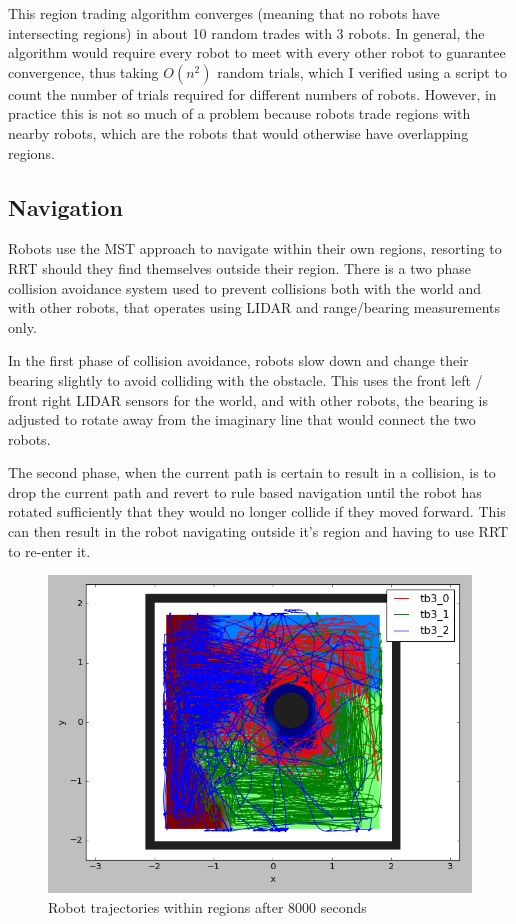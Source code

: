 \documentclass[a4paper, 10pt, conference]{ieeeconf}      %
\begin{document}
This region trading algorithm converges (meaning that no robots have intersecting regions) in about 10 random trades with 3 robots. In general, the algorithm would require every robot to meet with every other robot to guarantee convergence, thus taking $O(n^2)$ random trials, which I verified using a script to count the number of trials required for different numbers of robots. However, in practice this is not so much of a problem because robots trade regions with nearby robots, which are the robots that would otherwise have overlapping regions.

\subsection{Navigation}
Robots use the MST approach to navigate within their own regions, resorting to RRT should they find themselves outside their region. There is a two phase collision avoidance system used to prevent collisions both with the world and with other robots, that operates using LIDAR and range/bearing measurements only.

In the first phase of collision avoidance, robots slow down and change their bearing slightly to avoid colliding with the obstacle. This uses the front left / front right LIDAR sensors for the world, and with other robots, the bearing is adjusted to rotate away from the imaginary line that would connect the two robots.

The second phase, when the current path is certain to result in a collision, is to drop the current path and revert to rule based navigation until the robot has rotated sufficiently that they would no longer collide if they moved forward. This can then result in the robot navigating outside it's region and having to use RRT to re-enter it.

\begin{figure}
	\centering
	\includegraphics[width=0.8\columnwidth]{dec_t2_cover.png}
	\caption{Robot trajectories within regions after 8000 seconds}
    \label{fig:decCover}
\end{figure}
\end{document}
